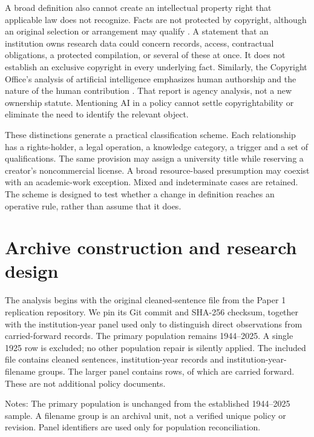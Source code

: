 \documentclass[12pt]{article}
\begin{document}
A broad definition also cannot create an intellectual property right that applicable law does not recognize. Facts are not protected by copyright, although an original selection or arrangement may qualify \citep{feist1991}. A statement that an institution owns research data could concern records, access, contractual obligations, a protected compilation, or several of these at once. It does not establish an exclusive copyright in every underlying fact. Similarly, the Copyright Office's analysis of artificial intelligence emphasizes human authorship and the nature of the human contribution \citep{usco2025}. That report is agency analysis, not a new ownership statute. Mentioning AI in a policy cannot settle copyrightability or eliminate the need to identify the relevant object.

These distinctions generate a practical classification scheme. Each relationship has a rights-holder, a legal operation, a knowledge category, a trigger and a set of qualifications. The same provision may assign a university title while reserving a creator's noncommercial license. A broad resource-based presumption may coexist with an academic-work exception. Mixed and indeterminate cases are retained. The scheme is designed to test whether a change in definition reaches an operative rule, rather than assume that it does.

\section{Archive construction and research design}
The analysis begins with the original cleaned-sentence file from the Paper 1 replication repository. We pin its Git commit and SHA-256 checksum, together with the institution-year panel used only to distinguish direct observations from carried-forward records. The primary population remains 1944--2025. A single 1925 row is excluded; no other population repair is silently applied. The included file contains \Sentences{} cleaned sentences, \Observed{} institution-year records and \DocKeys{} institution-year-filename groups. The larger panel contains \Panel{} rows, of which \Carried{} are carried forward. These are not additional policy documents.

\begin{table}[htbp]
\centering\caption{Frozen analytical population}\label{tab:population}

\par\smallskip\footnotesize\raggedright Notes: The primary population is unchanged from the established 1944--2025 sample. A filename group is an archival unit, not a verified unique policy or revision. Panel identifiers are used only for population reconciliation.
\end{table}
\end{document}
